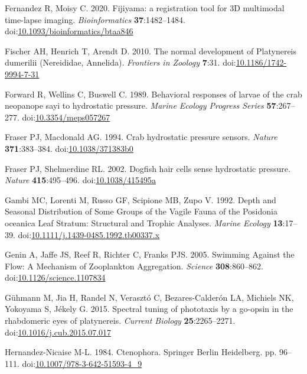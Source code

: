 \documentclass[
  11pt,
]{article}
\newlength{\cslhangindent}
\newenvironment{CSLReferences}[2] %
 {\begin{list}{}{%
  \setlength{\itemindent}{0pt}
  \setlength{\leftmargin}{0pt}
  \setlength{\parsep}{0pt}
  \ifodd #1
   \setlength{\leftmargin}{\cslhangindent}
   \setlength{\itemindent}{-1\cslhangindent}
  \fi
  \setlength{\itemsep}{#2\baselineskip}}}
 {\end{list}}
\begin{document}
\begin{CSLReferences}{1}{0}
Fernandez R, Moisy C. 2020. Fijiyama: a registration tool for 3D
multimodal time-lapse imaging. \emph{Bioinformatics}
\textbf{37}:1482--1484.
doi:\href{https://doi.org/10.1093/bioinformatics/btaa846}{10.1093/bioinformatics/btaa846}

Fischer AH, Henrich T, Arendt D. 2010. The normal development of
Platynereis dumerilii (Nereididae, Annelida). \emph{Frontiers in
Zoology} \textbf{7}:31.
doi:\href{https://doi.org/10.1186/1742-9994-7-31}{10.1186/1742-9994-7-31}

Forward R, Wellins C, Buswell C. 1989. Behavioral responses of larvae of
the crab neopanope sayi to hydrostatic pressure. \emph{Marine Ecology
Progress Series} \textbf{57}:267--277.
doi:\href{https://doi.org/10.3354/meps057267}{10.3354/meps057267}

Fraser PJ, Macdonald AG. 1994. Crab hydrostatic pressure sensors.
\emph{Nature} \textbf{371}:383--384.
doi:\href{https://doi.org/10.1038/371383b0}{10.1038/371383b0}

Fraser PJ, Shelmerdine RL. 2002. Dogfish hair cells sense hydrostatic
pressure. \emph{Nature} \textbf{415}:495--496.
doi:\href{https://doi.org/10.1038/415495a}{10.1038/415495a}

Gambi MC, Lorenti M, Russo GF, Scipione MB, Zupo V. 1992. Depth and
Seasonal Distribution of Some Groups of the Vagile Fauna of the
Posidonia oceanica Leaf Stratum: Structural and Trophic Analyses.
\emph{Marine Ecology} \textbf{13}:17--39.
doi:\href{https://doi.org/10.1111/j.1439-0485.1992.tb00337.x}{10.1111/j.1439-0485.1992.tb00337.x}

Genin A, Jaffe JS, Reef R, Richter C, Franks PJS. 2005. Swimming Against
the Flow: A Mechanism of Zooplankton Aggregation. \emph{Science}
\textbf{308}:860--862.
doi:\href{https://doi.org/10.1126/science.1107834}{10.1126/science.1107834}

Gühmann M, Jia H, Randel N, Verasztó C, Bezares-Calderón LA, Michiels
NK, Yokoyama S, Jékely G. 2015. Spectral tuning of phototaxis by a
go-opsin in the rhabdomeric eyes of platynereis. \emph{Current Biology}
\textbf{25}:2265--2271.
doi:\href{https://doi.org/10.1016/j.cub.2015.07.017}{10.1016/j.cub.2015.07.017}

Hernandez-Nicaise M-L. 1984. Ctenophora. Springer Berlin Heidelberg. pp.
96--111.
doi:\href{https://doi.org/10.1007/978-3-642-51593-4_9}{10.1007/978-3-642-51593-4\_9}


\end{CSLReferences}
\end{document}
